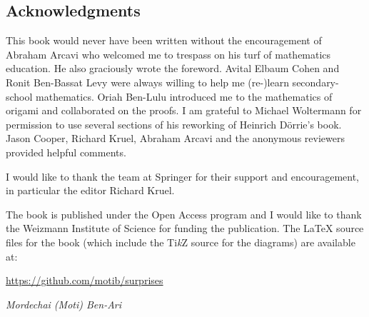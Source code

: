 \subsection*{Acknowledgments}

This book would never have been written without the encouragement of Abraham Arcavi who welcomed me to trespass on his turf of mathematics education. He also graciously wrote the foreword. Avital Elbaum Cohen and Ronit Ben-Bassat Levy were always willing to help me (re-)learn secondary-school mathematics. Oriah Ben-Lulu introduced me to the mathematics of origami and collaborated on the proofs. I am grateful to Michael Woltermann for permission to use several sections of his reworking of Heinrich D\"{o}rrie's book. Jason Cooper, Richard Kruel, Abraham Arcavi and the anonymous reviewers provided helpful comments.

I would like to thank the team at Springer for their support and encouragement, in particular the editor Richard Kruel.

The book is published under the Open Access program and I would like to thank the Weizmann Institute of Science for funding the publication. The \LaTeX{} source files for the book (which include the Ti\textit{k}Z source for the diagrams) are available at:
\begin{center}
\url{https://github.com/motib/surprises}
\end{center}

\medskip

\begin{flushright}
\textit{Mordechai (Moti) Ben-Ari}
\end{flushright}

\tableofcontents


